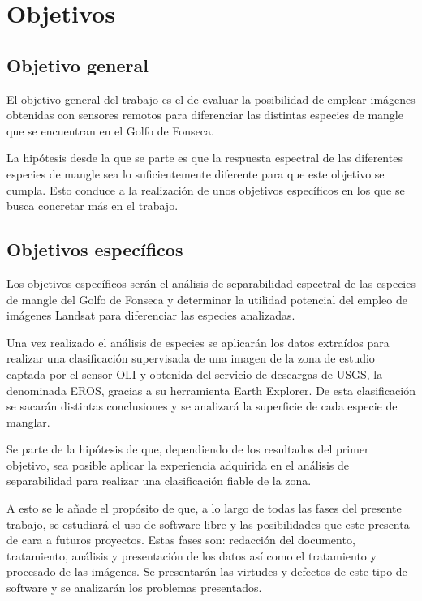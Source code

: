 \section{Objetivos}

\subsection{Objetivo general}
El objetivo general del trabajo es el de evaluar la posibilidad de emplear imágenes obtenidas con sensores remotos para diferenciar las distintas especies de mangle que se encuentran en el Golfo de Fonseca.\Sep

La hipótesis desde la que se parte es que la respuesta espectral de las diferentes especies de mangle sea lo suficientemente diferente para que este objetivo se cumpla. Esto conduce a la realización de unos objetivos específicos en los que se busca concretar más en el trabajo.

\subsection{Objetivos específicos}
Los objetivos específicos serán el análisis de separabilidad espectral de las especies de mangle del Golfo de Fonseca y determinar la utilidad potencial del empleo de imágenes Landsat para diferenciar las especies analizadas.\Sep

Una vez realizado el análisis de especies se aplicarán los datos extraídos para realizar una clasificación supervisada de una imagen de la zona de estudio captada por el sensor \ac{OLI} y obtenida del servicio de descargas de \ac{USGS}, la denominada \ac{EROS}, gracias a su herramienta Earth Explorer. De esta clasificación se sacarán distintas conclusiones y se analizará la superficie de cada especie de manglar.\Sep

Se parte de la hipótesis de que, dependiendo de los resultados del primer objetivo, sea posible aplicar la experiencia adquirida en el análisis de separabilidad para realizar una clasificación fiable de la zona.\Sep

A esto se le añade el propósito de que, a lo largo de todas las fases del presente trabajo, se estudiará el uso de software libre y las posibilidades que este presenta de cara a futuros proyectos. Estas fases son: redacción del documento, tratamiento, análisis y presentación de los datos así como el tratamiento y procesado de las imágenes. Se presentarán las virtudes y defectos de este tipo de software y se analizarán los problemas presentados.\Sep

